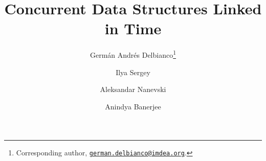 \documentclass[11pt,letterpaper]{article}
\begin{document}
\title{Concurrent Data Structures Linked in Time}

\author[1]{Germ\'{a}n Andr\'{e}s Delbianco\thanks{Corresponding
    author,
    \href{mailto:german.delbianco@imdea.org}{\texttt{german.delbianco@imdea.org}}.}}
\author[2]{Ilya Sergey} \author[1]{Aleksandar Nanevski}
\author[1]{Anindya Banerjee}  

\date{}

\clearpage\maketitle
\thispagestyle{empty}


\clearpage
\setcounter{page}{1}










\newpage
\appendix

\end{document}
